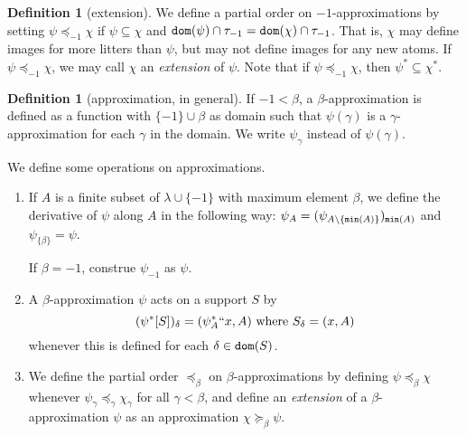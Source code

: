 \documentclass{article}
\theoremstyle{definition}
\newtheorem{lemma}[theorem]{Lemma}
\newtheorem{definition}[theorem]{Definition}
\theoremstyle{remark}
\begin{document}
\begin{definition}[extension]
  We define a partial order on $-1$-approximations by setting $\psi \preceq_{-1} \chi$ if $\psi \subseteq \chi$ and ${\tt dom}(\psi) \cap \tau_{-1} = {\tt dom}(\chi) \cap \tau_{-1}$.
  That is, $\chi$ may define images for more litters than $\psi$, but may not define images for any new atoms.
  If $\psi \preceq_{-1} \chi$, we may call $\chi$ an {\em extension\/} of $\psi$.
  Note that if $\psi \preceq_{-1} \chi$, then $\psi^* \subseteq \chi^*$.
\end{definition}
\begin{definition}[approximation, in general]\label{def:approx}
  If $-1 < \beta$, a $\beta$-approximation is defined as a function with $\{-1\} \cup \beta$ as domain such that $\psi(\gamma)$ is a $\gamma$-approximation for each $\gamma$ in the domain.  We write $\psi_\gamma$ instead of $\psi(\gamma)$.

  We define some operations on approximations.
  \begin{enumerate}
    \item If $A$ is a finite subset of $\lambda\cup \{-1\}$ with maximum element $\beta$, we define the derivative of $\psi$ along $A$ in the following way: $\psi_A = (\psi_{A \setminus \{{\tt min}(A)\}})_{{\tt min}(A)}$ and
$\psi_{\{\beta\}} = \psi$.

  If $\beta=-1$, construe $\psi_{-1}$ as $\psi$.

    \item A $\beta$-approximation $\psi$ acts on a support $S$ by
    $$ (\psi^*[S])_\delta = (\psi_A ^*`` x, A) \ \mathrm{where}\ S_\delta = (x, A) $$
    whenever this is defined for each $\delta \in {\tt dom}(S)$.
    \item We define the partial order $\preceq_\beta$ on $\beta$-approximations by defining $\psi \preceq_\beta \chi$ whenever $\psi_\gamma \preceq_\gamma \chi_\gamma$ for all $\gamma < \beta$, and define an {\em extension\/} of a $\beta$-approximation $\psi$ as an approximation $\chi \succeq_\beta \psi$.

  \end{enumerate}
\end{definition}
\end{document}
